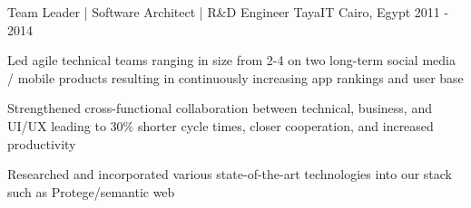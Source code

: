 \begin{cventries}


  \cventry
    {Team Leader | Software Architect | R\&D Engineer} %
    {TayaIT} %
    {Cairo, Egypt} %
    {2011 - 2014} %
    {
      \begin{cvitems} %
		\item {Led agile technical teams ranging in size from 2-4 on two long-term social media / mobile products resulting in continuously increasing app rankings and user base}
		\item {Strengthened cross-functional collaboration between technical, business, and UI/UX leading to 30\% shorter cycle times, closer cooperation, and increased productivity}
		\item {Researched and incorporated various state-of-the-art technologies into our stack such as Protege/semantic web}
      \end{cvitems}
    }





\end{cventries}
